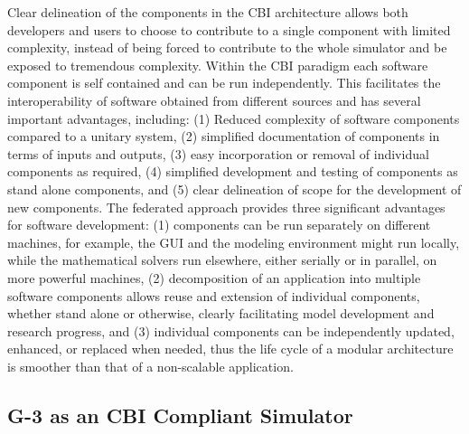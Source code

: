 \documentclass[12pt]{article}
\begin{document}
Clear delineation of the components in the CBI architecture allows
both developers and users to choose to contribute to a single
component with limited complexity, instead of being forced to
contribute to the whole simulator and be exposed to tremendous
complexity. Within the CBI paradigm each software component is self
contained and can be run independently. This facilitates the
interoperability of software obtained from different sources and has
several important advantages, including: (1) Reduced complexity of
software components compared to a unitary system, (2) simplified
documentation of components in terms of inputs and outputs, (3) easy
incorporation or removal of individual components as required, (4)
simplified development and testing of components as stand alone
components, and (5) clear delineation of scope for the development of
new components. The federated approach provides three significant
advantages for software development: (1) components can be run
separately on different machines, for example, the GUI and the
modeling environment might run locally, while the mathematical solvers
run elsewhere, either serially or in parallel, on more powerful
machines, (2) decomposition of an application into multiple software
components allows reuse and extension of individual components,
whether stand alone or otherwise, clearly facilitating model
development and research progress, and (3) individual components can
be independently updated, enhanced, or replaced when needed, thus the
life cycle of a modular architecture is smoother than that of a
non-scalable application.

\subsection{G-3 as an CBI Compliant Simulator}
\end{document}
